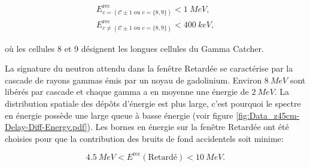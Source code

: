 \begin{align}
\label{eq:neighbor_E_cuts}
    E^\textrm{rec}_{c = (\mathcal{C} \pm 1 \textrm{ ou } c = \{8,9\})} < \SI{1}{MeV},\\
    E^\textrm{rec}_{c \neq (\mathcal{C} \pm 1 \textrm{ ou } c = \{8,9\})} < \SI{400}{keV},
\end{align}

\bigbreak

où les cellules 8 et 9 désignent les longues cellules du Gamma Catcher.

\bigbreak

La signature du neutron attendu dans la fenêtre Retardée se caractérise par la cascade de rayons gammas émis par un noyau de gadolinium. Environ $\SI{8}{MeV}$ sont libérés par cascade et chaque gamma a en moyenne une énergie de $\SI{2}{MeV}$. La distribution spatiale des dépôts d'énergie est plus large, c'est pourquoi le spectre en énergie possède une large queue à basse énergie (voir figure \ref{fig:Data_z45cm-Delay-Diff-Energy.pdf}). Les bornes en énergie sur la fenêtre Retardée ont été choisies pour que la contribution des bruits de fond accidentels soit minime:

\begin{equation}
    \SI{4.5}{MeV} < E^\textrm{rec}(\textrm{Retardé}) < \SI{10}{MeV}.
\end{equation}

\bigbreak


